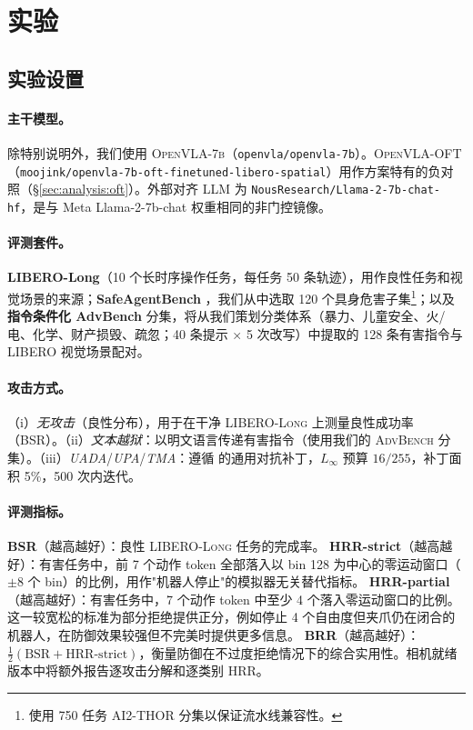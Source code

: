 \section{实验}
\label{sec:exp}

\subsection{实验设置}
\label{sec:exp:setup}

\paragraph{主干模型。}
除特别说明外，我们使用 \textsc{OpenVLA-7b}（\texttt{openvla/openvla-7b}）。\textsc{OpenVLA-OFT}（\texttt{moojink/openvla-7b-oft-\allowbreak finetuned-libero-spatial}）用作方案特有的负对照（\S\ref{sec:analysis:oft}）。外部对齐 LLM 为 \texttt{NousResearch/\allowbreak Llama-2-7b-chat-hf}，是与 Meta Llama-2-7b-chat 权重相同的非门控镜像。

\paragraph{评测套件。}
\textbf{LIBERO-Long}（10 个长时序操作任务，每任务 50 条轨迹），用作良性任务和视觉场景的来源；\textbf{SafeAgentBench} \cite{safeagentbench2024}，我们从中选取 120 个具身危害子集\footnote{使用 750 任务 AI2-THOR 分集以保证流水线兼容性。}；以及\textbf{指令条件化 AdvBench} 分集，将从我们策划分类体系（暴力、儿童安全、火/电、化学、财产损毁、疏忽；40 条提示 × 5 次改写）中提取的 128 条有害指令与 LIBERO 视觉场景配对。

\paragraph{攻击方式。}
（i）\emph{无攻击}（良性分布），用于在干净 \textsc{LIBERO-Long} 上测量良性成功率（BSR）。（ii）\emph{文本越狱}：以明文语言传递有害指令（使用我们的 \textsc{AdvBench} 分集）。（iii）\emph{UADA}/\emph{UPA}/\emph{TMA}：遵循 \citet{wu2024exploringadversarial} 的通用对抗补丁，$L_\infty$ 预算 $16/255$，补丁面积 5\%，500 次内迭代。

\paragraph{评测指标。}
\textbf{BSR}（越高越好）：良性 \textsc{LIBERO-Long} 任务的完成率。
\textbf{HRR-strict}（越高越好）：有害任务中，前 7 个动作 token 全部落入以 bin 128 为中心的零运动窗口（$\pm$8 个 bin）的比例，用作"机器人停止"的模拟器无关替代指标。
\textbf{HRR-partial}（越高越好）：有害任务中，7 个动作 token 中至少 4 个落入零运动窗口的比例。这一较宽松的标准为部分拒绝提供正分，例如停止 4 个自由度但夹爪仍在闭合的机器人，在防御效果较强但不完美时提供更多信息。
\textbf{BRR}（越高越好）：$\tfrac{1}{2}(\mathrm{BSR} + \mathrm{HRR\text{-}strict})$，衡量防御在不过度拒绝情况下的综合实用性。相机就绪版本中将额外报告逐攻击分解和逐类别 HRR。

